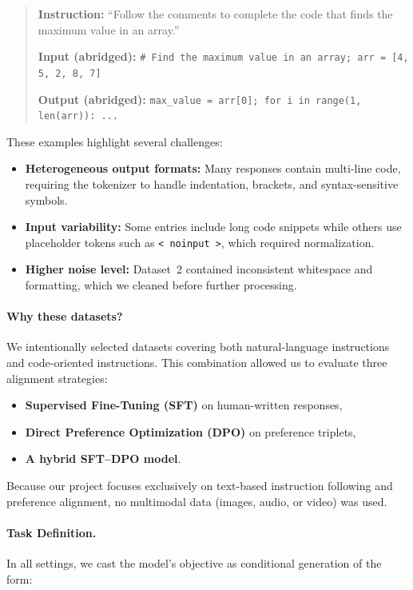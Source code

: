 \documentclass[11pt,a4paper]{article}
\begin{document}
\begin{quote}
\textbf{Instruction:} ``Follow the comments to complete the code that finds the maximum value in an array.''

\textbf{Input (abridged):}
\texttt{\# Find the maximum value in an array; arr = [4, 5, 2, 8, 7]}

\textbf{Output (abridged):}
\texttt{max\_value = arr[0]; for i in range(1, len(arr)): ...}
\end{quote}

These examples highlight several challenges:
\begin{itemize}
    \item \textbf{Heterogeneous output formats:} Many responses contain multi-line code, requiring the tokenizer to handle indentation, brackets, and syntax-sensitive symbols.
    \item \textbf{Input variability:} Some entries include long code snippets while others use placeholder tokens such as \verb|< noinput >|, which required normalization.
    \item \textbf{Higher noise level:} Dataset~2 contained inconsistent whitespace and formatting, which we cleaned before further processing.
\end{itemize}

\paragraph{Why these datasets?}
We intentionally selected datasets covering both natural-language instructions and code-oriented instructions. This combination allowed us to evaluate three alignment strategies:
\begin{itemize}
    \item \textbf{Supervised Fine-Tuning (SFT)} on human-written responses,
    \item \textbf{Direct Preference Optimization (DPO)} on preference triplets,
    \item \textbf{A hybrid SFT--DPO model}.
\end{itemize}
Because our project focuses exclusively on text-based instruction following and preference alignment, no multimodal data (images, audio, or video) was used.

\paragraph{Task Definition.}
In all settings, we cast the model’s objective as conditional generation of the form:
\end{document}
